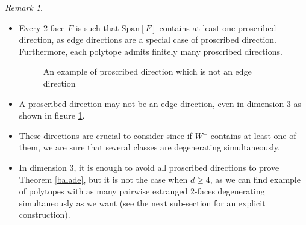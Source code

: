 \documentclass[12pt, notitlepage]{article}
\theoremstyle{plain}
\theoremstyle{definition}
\theoremstyle{plain}
\theoremstyle{remark}
\newtheorem*{rmk}{Remark}
\theoremstyle{plain}
\theoremstyle{plain}
\newcommand{\vect}{\text{Span}}
\begin{document}
\begin{rmk}
    \begin{itemize}
        \item Every 2-face $F$ is such that $\vect[F]$ contains at least one proscribed direction, as edge directions are a special case of proscribed direction. Furthermore, each polytope admits finitely many proscribed directions.
\begin{figure}[ht]
    \centering
    \caption{An example of proscribed direction which is not an edge direction}
    \label{fig:dir_proscrite}
\end{figure}
        \item A proscribed direction may not be an edge direction, even in dimension 3 as shown in figure \ref{fig:dir_proscrite}.
        \item These directions are crucial to consider since if $W^\perp$ contains at least one of them, we are sure that several classes are degenerating simultaneously.
        \item In dimension 3, it is enough to avoid all proscribed directions to prove Theorem \ref{balade}, but it is not the case when $d\geq 4$, as we can find example of polytopes with as many pairwise estranged 2-faces degenerating simultaneously as we want (see the next sub-section for an explicit construction).
    \end{itemize}
\end{rmk}
\end{document}

